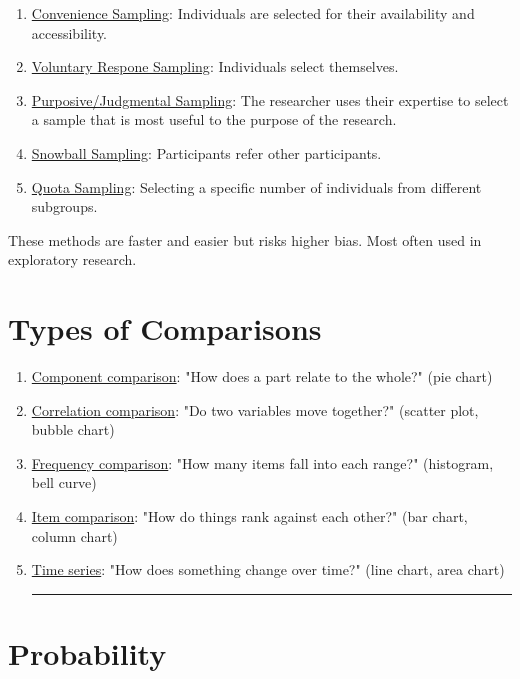 \documentclass[11pt]{article}
\begin{document}
\begin{enumerate}
\item \uline{Convenience Sampling}: Individuals are selected for their availability and accessibility.

\item \uline{Voluntary Respone Sampling}: Individuals select themselves.

\item \uline{Purposive/Judgmental Sampling}: The researcher uses their expertise to select a sample that is most useful to the purpose of the research.

\item \uline{Snowball Sampling}: Participants refer other participants.

\item \uline{Quota Sampling}: Selecting a specific number of individuals from different subgroups.
\end{enumerate}

These methods are faster and easier but risks higher bias. Most often used in exploratory research.
\section{Types of Comparisons}
\label{sec:org8248ffb}

\begin{enumerate}
\item \uline{Component comparison}: "How does a part relate to the whole?" (pie chart)

\item \uline{Correlation comparison}: "Do two variables move together?" (scatter plot, bubble chart)

\item \uline{Frequency comparison}: "How many items fall into each range?" (histogram, bell curve)

\item \uline{Item comparison}: "How do things rank against each other?" (bar chart, column chart)

\item \uline{Time series}: "How does something change over time?" (line chart, area chart)

\noindent\rule{\textwidth}{0.5pt}
\end{enumerate}
\section{Probability}
\label{sec:org65d74b6}
\end{document}
